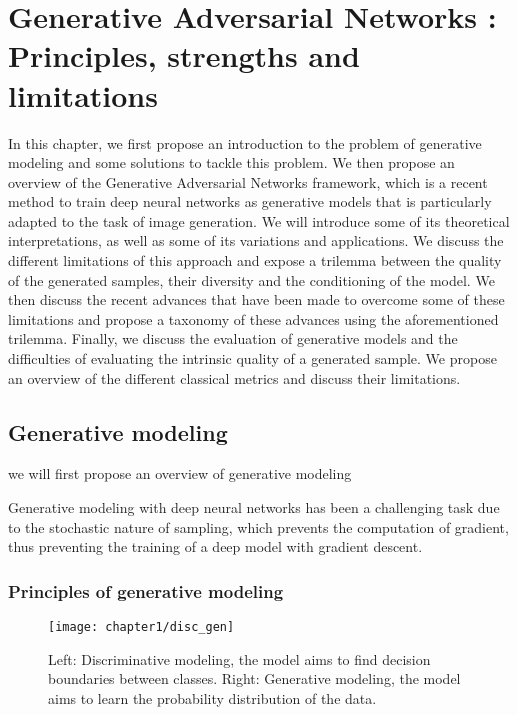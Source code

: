 \chapter{Generative Adversarial Networks : Principles, strengths and limitations}
\label{chap:chapter1}

\begin{chapterabstract}
	In this chapter, we first propose an introduction to the problem of generative modeling and some solutions to tackle this problem. We then propose an overview of the Generative Adversarial Networks \cite{Goodfellow2014} framework, which is a recent method to train deep neural networks as generative models that is particularly adapted to the task of image generation. We will introduce some of its theoretical interpretations, as well as some of its variations and applications. We discuss the different limitations of this approach and expose a trilemma between the quality of the generated samples, their diversity and the conditioning of the model. We then discuss the recent advances that have been made to overcome some of these limitations and propose a taxonomy of these advances using the aforementioned trilemma. Finally, we discuss the evaluation of generative models and the difficulties of evaluating the intrinsic quality of a generated sample.  We propose an overview of the different classical metrics and discuss their limitations.
\end{chapterabstract}

\minitoc
\newpage

\section{Generative modeling}
we will first propose an overview of generative modeling

Generative modeling with deep neural networks has been a challenging task due to the stochastic nature of sampling, which prevents the computation of gradient, thus preventing the training of a deep model with gradient descent.  %

\subsection{Principles of generative modeling}

\begin{figure}
	\centering
	\texttt{[image: chapter1/disc\_gen]}
	\caption[Generative modeling]{Left: Discriminative modeling, the model aims to find decision boundaries between classes. Right: Generative modeling, the model aims to learn the probability distribution of the data.}
	\label{fig:disc_gen}
\end{figure}

